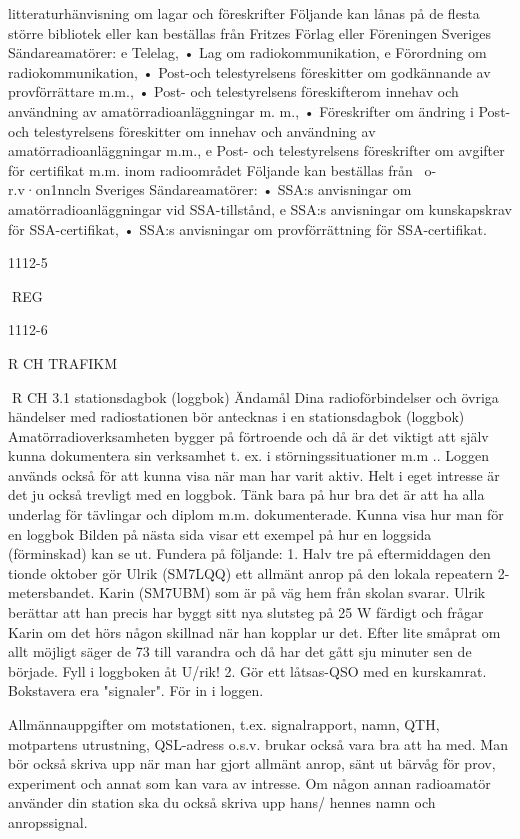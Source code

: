 \documentclass[a4paper,twoside,twocolumn,openright]{book}
\begin{document}
{{{{{litteraturhänvisning om lagar och föreskrifter
Följande kan lånas på de flesta större bibliotek eller kan beställas från Fritzes Förlag
eller Föreningen Sveriges Sändareamatörer:
e Telelag,
• Lag om radiokommunikation,
e Förordning om radiokommunikation,
• Post-och telestyrelsens föreskitter om godkännande av provförrättare m.m.,
• Post- och telestyrelsens föreskifterom innehav och användning av amatörradioanläggningar m. m.,
• Föreskrifter om ändring i Post- och telestyrelsens föreskitter om innehav och användning av amatörradioanläggningar
m.m.,
e Post- och telestyrelsens föreskrifter om
avgifter för certifikat m.m. inom radioområdet
Följande kan beställas från
~o-r.v·on1nncln Sveriges Sändareamatörer:
• SSA:s anvisningar om amatörradioanläggningar vid SSA-tillstånd,
e SSA:s anvisningar om kunskapskrav för
SSA-certifikat,
• SSA:s anvisningar om provförrättning för
SSA-certifikat.

1112-5

REG

1112-6

R CH TRAFIKM

R CH
3.1 stationsdagbok (loggbok)
Ändamål
Dina radioförbindelser och övriga händelser
med radiostationen bör antecknas i en
stationsdagbok (loggbok)
Amatörradioverksamheten bygger på förtroende och då är det viktigt att själv kunna
dokumentera sin verksamhet t. ex. i störningssituationer m.m .. Loggen används också för
att kunna visa när man har varit aktiv.
Helt i eget intresse är det ju också trevligt
med en loggbok. Tänk bara på hur bra det är
att ha alla underlag för tävlingar och diplom
m.m. dokumenterade.
Kunna visa hur man för en loggbok
Bilden på nästa sida visar ett exempel på
hur en loggsida (förminskad) kan se ut.
Fundera på följande:
1. Halv tre på eftermiddagen den tionde
oktober gör Ulrik (SM7LQQ) ett allmänt anrop på den lokala repeatern 2-metersbandet.
Karin (SM7UBM) som är på väg hem från
skolan svarar. Ulrik berättar att han precis
har byggt sitt nya slutsteg på 25 W färdigt
och frågar Karin om det hörs någon skillnad
när han kopplar ur det. Efter lite småprat om
allt möjligt säger de 73 till varandra och då
har det gått sju minuter sen de började.
Fyll i loggboken åt U/rik!
2. Gör ett låtsas-QSO med en kurskamrat. Bokstavera era "signaler". För in i loggen.

Allmännauppgifter om motstationen, t.ex.
signalrapport, namn, QTH, motpartens utrustning, QSL-adress o.s.v. brukar också
vara bra att ha med.
Man bör också skriva upp när man har
gjort allmänt anrop, sänt ut bärvåg för prov,
experiment och annat som kan vara av intresse.
Om någon annan radioamatör använder
din station ska du också skriva upp hans/
hennes namn och anropssignal.

}}}}}
\end{document}
